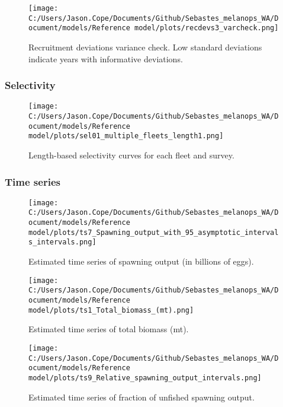\documentclass[11pt,
  letterpaper,
]{article}
\begin{document}
\begin{figure}
{\centering
\texttt{[image: C:/Users/Jason.Cope/Documents/Github/Sebastes\_melanops\_WA/Document/models/Reference model/plots/recdevs3\_varcheck.png]}
}
\caption{Recruitment deviations variance check. Low standard deviations indicate years with informative deviations.\label{fig:varcheck}}
\end{figure}

\pagebreak

\hypertarget{selectivity}{%
\subsubsection{Selectivity}\label{selectivity}}

\begin{figure}
{\centering
\texttt{[image: C:/Users/Jason.Cope/Documents/Github/Sebastes\_melanops\_WA/Document/models/Reference model/plots/sel01\_multiple\_fleets\_length1.png]}
}
\caption{Length-based selectivity curves for each fleet and survey.\label{fig:fleet_selectivity}}
\end{figure}

\pagebreak

\hypertarget{time-series}{%
\subsubsection{Time series}\label{time-series}}

\begin{figure}
{\centering
\texttt{[image: C:/Users/Jason.Cope/Documents/Github/Sebastes\_melanops\_WA/Document/models/Reference model/plots/ts7\_Spawning\_output\_with\_95\_asymptotic\_intervals\_intervals.png]}
}
\caption{Estimated time series of spawning output (in billions of eggs).\label{fig:ssb}}
\end{figure}

\pagebreak

\begin{figure}
{\centering
\texttt{[image: C:/Users/Jason.Cope/Documents/Github/Sebastes\_melanops\_WA/Document/models/Reference model/plots/ts1\_Total\_biomass\_(mt).png]}
}
\caption{Estimated time series of total biomass (mt).\label{fig:tot-bio}}
\end{figure}

\pagebreak

\begin{figure}
{\centering
\texttt{[image: C:/Users/Jason.Cope/Documents/Github/Sebastes\_melanops\_WA/Document/models/Reference model/plots/ts9\_Relative\_spawning\_output\_intervals.png]}
}
\caption{Estimated time series of fraction of unfished spawning output.\label{fig:depl}}
\end{figure}
\end{document}
